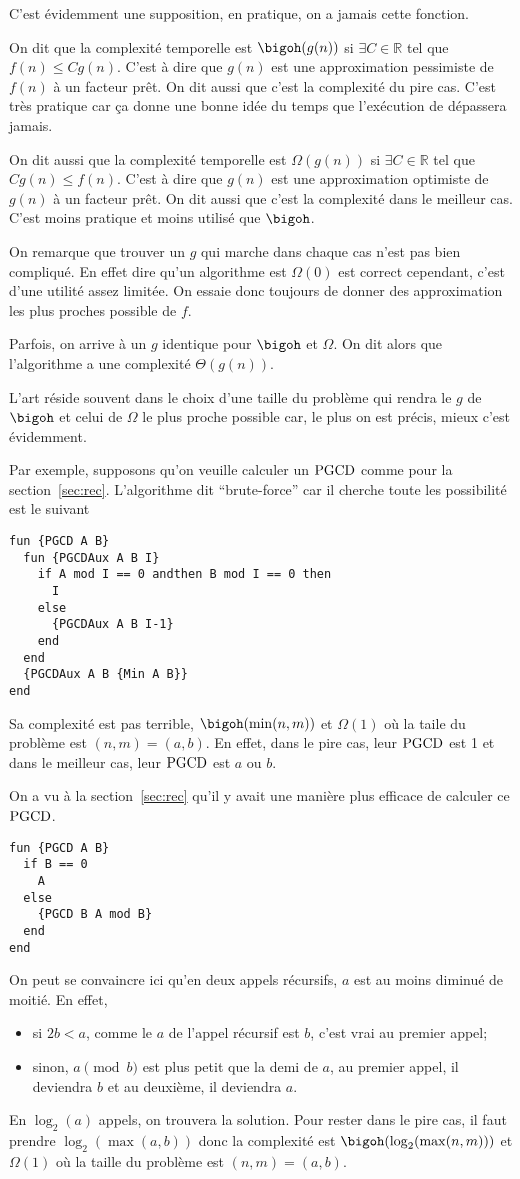 C'est évidemment une supposition, en pratique,
on a jamais cette fonction.

On dit que la complexité temporelle est $\bigoh(g(n))$ si
$\exists C \in \mathbb{R}$ tel que $f(n) \leq C g(n)$.
C'est à dire que $g(n)$ est une approximation pessimiste de $f(n)$
à un facteur prêt.
On dit aussi que c'est la complexité du pire cas.
C'est très pratique car ça donne une bonne idée du temps
que l'exécution de dépassera jamais.

On dit aussi que la complexité temporelle est $\Omega(g(n))$ si
$\exists C \in \mathbb{R}$ tel que $C g(n) \leq f(n)$.
C'est à dire que $g(n)$ est une approximation optimiste de $g(n)$
à un facteur prêt.
On dit aussi que c'est la complexité dans le meilleur cas.
C'est moins pratique et moins utilisé que $\bigoh$.

On remarque que trouver un $g$ qui marche dans chaque cas
n'est pas bien compliqué. En effet dire qu'un algorithme est
$\Omega(0)$ est correct cependant, c'est d'une utilité assez limitée.
On essaie donc toujours de donner des approximation les plus proches
possible de $f$.

Parfois, on arrive à un $g$ identique pour $\bigoh$ et $\Omega$.
On dit alors que l'algorithme a une complexité $\Theta(g(n))$.

L'art réside souvent dans le choix d'une taille du problème qui
rendra le $g$ de $\bigoh$ et celui de $\Omega$ le plus proche possible
car, le plus on est précis, mieux c'est évidemment.

Par exemple, supposons qu'on veuille calculer un $\operatorname{PGCD}$
comme pour la section~\ref{sec:rec}.
L'algorithme dit ``brute-force'' car il cherche toute les possibilité
est le suivant
\begin{lstlisting}
fun {PGCD A B}
  fun {PGCDAux A B I}
    if A mod I == 0 andthen B mod I == 0 then
      I
    else
      {PGCDAux A B I-1}
    end
  end
  {PGCDAux A B {Min A B}}
end
\end{lstlisting}
Sa complexité est pas terrible, $\bigoh(\min(n,m))$ et $\Omega(1)$
où la taile du problème est $(n, m) = (a, b)$.
En effet, dans le pire cas, leur $\operatorname{PGCD}$ est 1 et dans le meilleur
cas, leur $\operatorname{PGCD}$ est $a$ ou $b$.

On a vu à la section~\ref{sec:rec} qu'il y avait une manière plus
efficace de calculer ce $\operatorname{PGCD}$.
\begin{lstlisting}
fun {PGCD A B}
  if B == 0
    A
  else
    {PGCD B A mod B}
  end
end
\end{lstlisting}
On peut se convaincre ici qu'en deux appels récursifs,
$a$ est au moins diminué de moitié.
En effet,
\begin{itemize}
  \item si $2b < a$, comme le $a$ de l'appel récursif est $b$, c'est
    vrai au premier appel;
  \item sinon, $a \pmod{b}$ est plus petit que la demi de $a$, au premier
    appel, il deviendra $b$ et au deuxième, il deviendra $a$.
\end{itemize}
En $\log_2(a)$ appels, on trouvera la solution.
Pour rester dans le pire cas, il faut prendre $\log_2(\max(a, b))$
donc la complexité est $\bigoh(\log_2(\max(n, m)))$ et $\Omega(1)$ où
la taille du problème est $(n,m) = (a, b)$.

